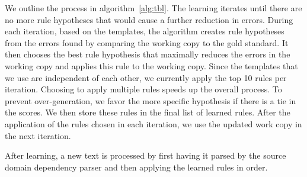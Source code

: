 We outline the process in algorithm~\ref{alg:tbl}. The learning iterates until there are no more rule hypotheses that would cause a further reduction in errors. During each iteration, based on the templates, the algorithm creates rule hypotheses from the errors found by comparing the working copy to the gold standard. It then chooses the best rule hypothesis that maximally reduces the errors in the working copy and applies this rule to the working copy. %
Since the templates that we use are independent of each other, we currently apply the top 10 rules per iteration. Choosing to apply multiple rules speeds up the overall process. To prevent over-generation, we favor the more specific hypothesis if there is a tie in the scores. We then store these rules in the final list of learned rules. %
After the application of the rules chosen in each iteration, we use the updated work copy in the next iteration. %

After learning, a new text is processed by first having it parsed by the source domain dependency parser and then applying the learned rules in order.


